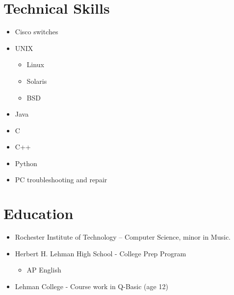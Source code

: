 \documentclass[margin]{res}
\begin{document}
 


\address{{\bf School Address} \\ Rochester Institute of Technology \\ Computer
Science \\ 39 Nathaniel Rochester Hall \\ Rochester, NY 14623}
\address{{\bf Permanent Address} \\ 2710 Avenue J N/W \\ Winter Haven, FL
33881 \\ (863) 514-7014 \\ russ@eatnumber1.com}
 
\begin{resume} 

\section{Technical Skills}
	\begin{itemize} \itemsep -2pt
		\item Cisco switches
		\item UNIX
		\begin{itemize} \itemsep -2pt
			\item Linux
			\item Solaris
			\item BSD
		\end{itemize}
		\item Java
		\item C
		\item C++
		\item Python
		\item PC troubleshooting and repair
	 \end{itemize}

\section{Education}
	\begin{itemize} \itemsep -2pt
		\item Rochester Institute of Technology – Computer Science, minor in Music.
		\item Herbert H. Lehman High School - College Prep Program
		\begin{itemize} \itemsep -2pt
			\item AP English
		\end{itemize}
		\item Lehman College - Course work in Q-Basic (age 12)
	\end{itemize}


\end{resume}
\end{document}

